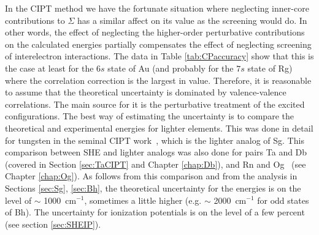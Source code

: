 \documentclass[10pt,a4paper, twoside, openright]{report}
\begin{document}
In the CIPT method we have the fortunate situation where neglecting inner-core contributions to $\Sigma$ has a similar affect on its value as the screening would do. In other words, the effect of neglecting the higher-order perturbative contributions on
the calculated energies partially compensates the effect of neglecting
screening of interelectron interactions. The data in Table \ref{tab:CPaccuracy} show that this is the case at least for the
$6s$ state of Au (and probably for the $7s$ state of Rg) where the correlation correction
is the largest in value. Therefore, it is reasonable to assume that the theoretical uncertainty is dominated by valence-valence correlations. The main source for it is the perturbative treatment of the excited configurations. The best way of estimating the uncertainty is to compare the theoretical and experimental energies for lighter elements. This was done in detail for tungsten in the seminal CIPT work~\cite{DBHF2017}, which is the lighter analog of Sg.  This comparison between SHE and lighter analogs was also done for pairs Ta and Db~\cite{LDFDb2018} (covered in Section \ref{sec:TaCIPT} and Chapter \ref{chap:Db}), and Rn and Og~\cite{LDFOg2018} (see Chapter \ref{chap:Og}). As follows from this comparison and from the analysis in Sections \ref{sec:Sg}, \ref{sec:Bh}, the theoretical uncertainty for the energies is on the level of $\sim$ 1000~cm$^{-1}$, sometimes a little higher (e.g.  $\sim$ 2000~cm$^{-1}$ for odd states of Bh). The uncertainty for ionization potentials is on the level of a few percent (see section \ref{sec:SHEIP}).
\end{document}

